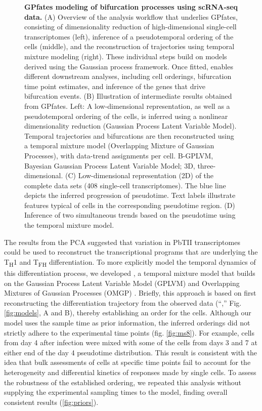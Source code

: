 \begin{figure} [t!]
      \caption[GPfates modeling of bifurcation processes using scRNA-seq data]{\textbf{GPfates modeling of bifurcation processes using scRNA-seq data.} (A) Overview of the analysis workflow that underlies GPfates, consisting of dimensionality reduction of high-dimensional single-cell transcriptomes (left), inference of a pseudotemporal ordering of the cells (middle), and the reconstruction of trajectories using temporal mixture modeling (right). These individual steps build on models derived using the Gaussian process framework. Once fitted,  enables different downstream analyses, including cell orderings, bifurcation time point estimates, and inference of the genes that drive bifurcation events. (B) Illustration of intermediate results obtained from GPfates. Left: A low-dimensional representation, as well as a pseudotemporal ordering of the cells, is inferred using a nonlinear dimensionality reduction (Gaussian Process Latent Variable Model). Temporal trajectories and bifurcations are then reconstructed using a temporal mixture model (Overlapping Mixture of Gaussian Processes), with data-trend assignments per cell. B-GPLVM, Bayesian Gaussian Process Latent Variable Model; 3D, three-dimensional. (C) Low-dimensional representation (2D) of the complete data sets (408 single-cell transcriptomes). The blue line depicts the inferred progression of pseudotime. Text labels illustrate features typical of cells in the corresponding pseudotime region. (D) Inference of two simultaneous trends based on the pseudotime using the temporal mixture model.}
\end{figure}

The results from the PCA suggested that variation in PbTII transcriptomes could be used to reconstruct the transcriptional programs that are underlying the T\textsubscript{H}1 and T\textsubscript{FH} differentiation. To more explicitly model the temporal dynamics of this differentiation process, we developed , a temporal mixture model that builds on the Gaussian Process Latent Variable Model (GPLVM) \cite{Lawrence2006-it} and Overlapping Mixtures of Gaussian Processes (OMGP) \cite{Lazaro-Gredilla2012-ta}. Briefly, this approach is based on first reconstructing the differentiation trajectory from the observed data (``,'' Fig. \ref{fig:models}, A and B), thereby establishing an order for the cells. Although our model uses the sample time as prior information, the inferred orderings did not strictly adhere to the experimental time points (fig. \ref{fig:ms8}). For example, cells from day 4 after infection were mixed with some of the cells from days 3 and 7 at either end of the day 4 pseudotime distribution. This result is consistent with the idea that bulk assessments of cells at specific time points fail to account for the heterogeneity and differential kinetics of responses made by single cells. To assess the robustness of the established ordering, we repeated this analysis without supplying the experimental sampling times to the model, finding overall consistent results (\ref{fig:priors}).

